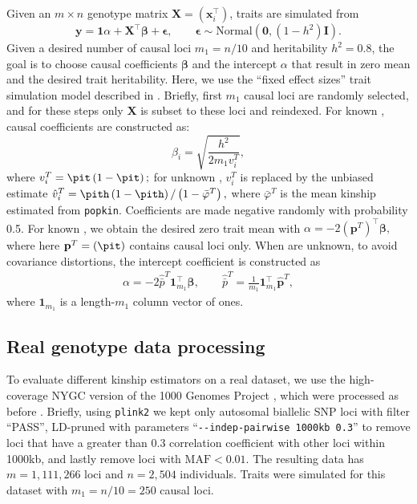 \documentclass[11pt]{article}
\begin{document}
Given an $m \times n$ genotype matrix $\mathbf{X} = (\mathbf{x}_i^\intercal)$, traits are simulated from
$$
\mathbf{y}
=
\mathbf{1} \alpha + \mathbf{X}^\intercal \boldsymbol{\beta} + \boldsymbol{\epsilon}
, \quad\quad
\boldsymbol{\epsilon} \sim \text{Normal}(\mathbf{0}, (1 - h^2) \mathbf{I})
.
$$
Given a desired number of causal loci $m_1 = n/10$ and heritability $h^2=0.8$, the goal is to choose causal coefficients $\boldsymbol{\beta}$ and the intercept $\alpha$ that result in zero mean and the desired trait heritability.
Here, we use the ``fixed effect sizes'' trait simulation model described in \citep{yao_limitations_2022}.
Briefly, first $m_1$ causal loci are randomly selected, and for these steps only $\mathbf{X}$ is subset to these loci and reindexed.
For known \pit, causal coefficients are constructed as:
$$
\beta_i = \sqrt{ \frac{h^2}{ 2 m_1 v_i^T } },
$$
where
$
v_i^T
=
\pit \left( 1 - \pit \right)
;
$
for unknown \pit,  $v_i^T$ is replaced by the unbiased estimate
$
\hat{v}_i^T
=
\pith \left( 1 - \pith \right) / \left( 1 - \bar{\varphi}^T \right)
,
$
where $\bar{\varphi}^T$ is the mean kinship estimated from \texttt{popkin}.
Coefficients are made negative randomly with probability 0.5.
For known \pit, we obtain the desired zero trait mean with
$
\alpha 
=
- 2 \left( \mathbf{p}^T \right)^\intercal \boldsymbol{\beta}
,
$
where here $\mathbf{p}^T = (\pit)$ contains causal loci only.
When \pit are unknown, to avoid covariance distortions, the intercept coefficient is constructed as
\begin{align*}
  \alpha 
  =
  - 2 \hat{\bar{p}}^T \mathbf{1}_{m_1}^\intercal \boldsymbol{\beta}
  , \quad\quad
  \hat{\bar{p}}^T
  =
  \frac{1}{m_1} \mathbf{1}_{m_1}^\intercal \mathbf{\hat{p}}^T
  ,
\end{align*}
where $\mathbf{1}_{m_1}$ is a length-$m_1$ column vector of ones.

\subsection{Real genotype data processing}

To evaluate different kinship estimators on a real dataset, we use the high-coverage NYGC version of the 1000 Genomes Project \citep{fairley_international_2020}, which were processed as before \citep{yao_limitations_2022}.
Briefly, using \texttt{plink2} \citep{chang_second-generation_2015} we kept only autosomal biallelic SNP loci with filter ``PASS'', LD-pruned with parameters ``\texttt{-{}-indep-pairwise 1000kb 0.3}'' to remove loci that have a greater than 0.3 correlation coefficient with other loci within 1000kb, and lastly remove loci with $\text{MAF} < 0.01$.
The resulting data has $m=1,111,266$ loci and $n=2,504$ individuals.
Traits were simulated for this dataset with $m_1 = n/10 = 250$ causal loci.
\end{document}
